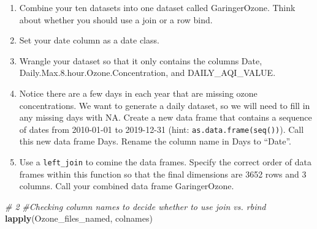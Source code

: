 \documentclass[]{article}
\newenvironment{Shaded}{\begin{snugshade}}{\end{snugshade}}
\newcommand{\CommentTok}[1]{\textcolor[rgb]{0.56,0.35,0.01}{\textit{#1}}}
\newcommand{\KeywordTok}[1]{\textcolor[rgb]{0.13,0.29,0.53}{\textbf{#1}}}
\newcommand{\NormalTok}[1]{#1}
\begin{document}
\begin{enumerate}
\def\labelenumi{\arabic{enumi}.}
\setcounter{enumi}{1}
\item
  Combine your ten datasets into one dataset called GaringerOzone. Think
  about whether you should use a join or a row bind.
\item
  Set your date column as a date class.
\item
  Wrangle your dataset so that it only contains the columns Date,
  Daily.Max.8.hour.Ozone.Concentration, and DAILY\_AQI\_VALUE.
\item
  Notice there are a few days in each year that are missing ozone
  concentrations. We want to generate a daily dataset, so we will need
  to fill in any missing days with NA. Create a new data frame that
  contains a sequence of dates from 2010-01-01 to 2019-12-31 (hint:
  \texttt{as.data.frame(seq())}). Call this new data frame Days. Rename
  the column name in Days to ``Date''.
\item
  Use a \texttt{left\_join} to comine the data frames. Specify the
  correct order of data frames within this function so that the final
  dimensions are 3652 rows and 3 columns. Call your combined data frame
  GaringerOzone.
\end{enumerate}

\begin{Shaded}
\begin{Highlighting}[]
\CommentTok{# 2 }
\CommentTok{#Checking column names to decide whether to use join vs. rbind}
\KeywordTok{lapply}\NormalTok{(Ozone_files_named, colnames)}
\end{Highlighting}
\end{Shaded}
\end{document}
